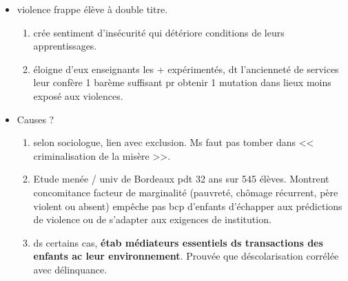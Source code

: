 \documentclass[12pt]{report}
\begin{document}
\begin{itemize}
\begin{itemize}

\vspace{0.5cm}

\item  violence frappe élève à double titre.
\begin{enumerate}
\item crée sentiment d'insécurité qui détériore conditions de leurs apprentissages.\\
\item éloigne d'eux enseignants les + expérimentés, dt l'ancienneté de services leur confère 1 barème suffisant pr obtenir 1 mutation dans lieux moins exposé aux violences.\\
\end{enumerate}

\item Causes ?
\begin{enumerate}
\item selon sociologue, lien avec exclusion. Ms faut pas tomber dans << criminalisation de la misère >>.
\item Etude menée / univ  de Bordeaux pdt 32 ans sur 545 élèves. Montrent concomitance facteur de marginalité (pauvreté, chômage récurrent, père violent ou absent) empêche pas bcp d'enfants d'échapper aux prédictions de violence ou de s'adapter aux exigences de institution.\\
\item ds certains cas, \textbf{étab médiateurs essentiels ds transactions des enfants ac leur environnement}. Prouvée que déscolarisation corrélée avec délinquance.
\end{enumerate}


\end{itemize}
\end{itemize}
\end{document}
